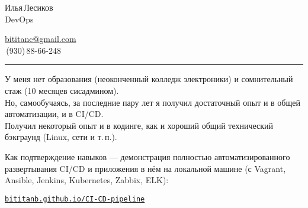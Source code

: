 \documentclass[11pt, a4paper]{article}
\newcommand\rurl[1]{%
  \href{http://#1}{\nolinkurl{#1}}%
}
\begin{document}
{\setlength\multicolsep{0pt}%
\begin{multicols}{2}

\begin{spacing}{1.5}
  {\LARGE Илья\,Лесиков}\\
  {\large DevOps}\hspace{1.3cm}{\large 25\,лет}
\end{spacing}

\columnbreak

\begin{flushright}
  \begin{spacing}{1.3}
    {\large \href{mailto:bititanc@gmail.com}{bititanc@gmail.com}}\\
    \fontsize{1.4em}{0}\,(930)\,88-66-248 \normalsize\\
  \end{spacing}
\end{flushright}

\end{multicols}
}

\vspace{-10pt}
\textcolor[RGB]{220,220,220}{\rule{\linewidth}{0.2pt}}
\vspace{5pt}

У меня нет образования (неоконченный колледж электроники) и сомнительный стаж (10 месяцев сисадмином).\\
Но, самообучаясь, за последние пару лет я получил достаточный опыт и в общей автоматизации, и в CI/CD.\\
Получил некоторый опыт и в кодинге, как и хороший общий технический бэкграунд (Linux, сети и т.\,п.).

Как подтверждение навыков — демонстрация полностью автоматизированного развертывания CI/CD и приложения в нём на локальной машине (с Vagrant, Ansible, Jenkins, Kubernetes, Zabbix, ELK):

\rurl{bititanb.github.io/CI-CD-pipeline}
\end{document}
